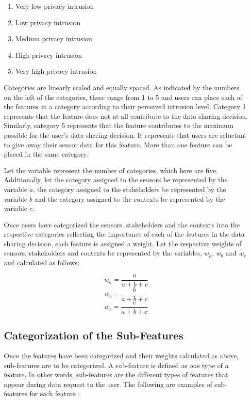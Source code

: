 \begin{enumerate}
\item Very low privacy intrusion
\item Low privacy intrusion
\item Medium privacy intrusion
\item High privacy intrusion
\item Very high privacy intrusion
\end{enumerate}

Categories are linearly scaled and equally spaced. As indicated by the numbers on the left of the categories, these range from 1 to 5 and users can place each of the features in a category according to their perceived intrusion level. Category 1 represents that the feature does not at all contribute to the data sharing decision. Similarly, category 5 represents that the feature contributes to the maximum possible for the user's data sharing decision. It represents that users are reluctant to give away their sensor data for this feature. More than one feature can be placed in the same category.

Let the variable \numcategories represent the number of categories, which here are five. Additionally, let the category assigned to the sensors be represented by the variable $a$, the category assigned to the stakeholders be represented by the variable $b$ and the category assigned to the contexts be represented by the variable $c$.

Once users have categorized the sensors, stakeholders and the contexts into the respective categories reflecting the importance of each of the features in the data sharing decision, each feature is assigned a weight. Let the respective weights of sensors, stakeholders and contexts be represented by the variables, $w_{a}$, $w_{b}$ and $w_{c}$ and calculated as follows:

\begin{equation}
   w_{a} = \frac{a}{a+b+c} 
\end{equation}
\begin{equation}
   w_{b} = \frac{b}{a+b+c}   
\end{equation}
\begin{equation}
   w_{c} = \frac{c}{a+b+c}   
\end{equation}


\subsection{Categorization of the Sub-Features}
Once the features have been categorized and their weights calculated as above, sub-features are to be categorized. A sub-feature
is defined as one type of a feature. In other words, sub-features are the different types of features that appear during data request to the user. The following are examples of sub-features for each feature :

